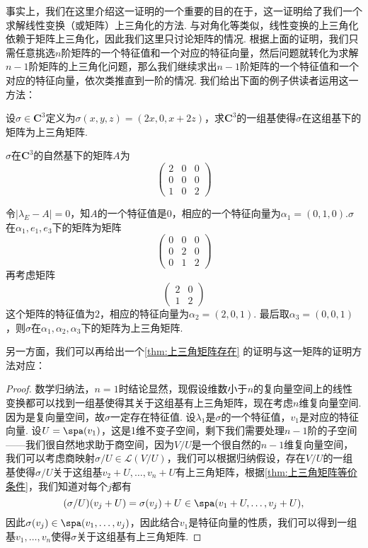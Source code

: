事实上，我们在这里介绍这一证明的一个重要的目的在于，这一证明给了我们一个求解线性变换（或矩阵）上三角化的方法. 与对角化等类似，线性变换的上三角化依赖于矩阵上三角化，因此我们这里只讨论矩阵的情况. 根据上面的证明，我们只需任意挑选$n$阶矩阵的一个特征值和一个对应的特征向量，然后问题就转化为求解$n-1$阶矩阵的上三角化问题，那么我们继续求出$n-1$阶矩阵的一个特征值和一个对应的特征向量，依次类推直到一阶的情况. 我们给出下面的例子供读者运用这一方法：
\begin{example}{}{}
    设$\sigma\in\mathbf{C}^3$定义为$\sigma(x,y,z)=(2x,0,x+2z)$，求$\mathbf{C}^3$的一组基使得$\sigma$在这组基下的矩阵为上三角矩阵.
\end{example}

\begin{solution}
    $\sigma$在$\mathbf{C}^3$的自然基下的矩阵$A$为
    \[ \begin{pmatrix}
        2 & 0 & 0 \\
        0 & 0 & 0 \\
        1 & 0 & 2
    \end{pmatrix} \]

    令$|\lambda_E-A|=0$，知$A$的一个特征值是$0$，相应的一个特征向量为$\alpha_1=(0,1,0)$.$\sigma$在$\alpha_1,e_1,e_3$下的矩阵为矩阵
    \[ \begin{pmatrix}
        0 & 0 & 0 \\
        0 & 2 & 0 \\
        0 & 1 & 2
    \end{pmatrix} \]
    再考虑矩阵
    \[ \begin{pmatrix}
        2 & 0 \\
        1 & 2
    \end{pmatrix} \]
    这个矩阵的特征值为$2$，相应的特征向量为$\alpha_2=(2,0,1)$. 最后取$\alpha_3=(0,0,1)$，则$\sigma$在$\alpha_1,\alpha_2,\alpha_3$下的矩阵为上三角矩阵.
\end{solution}

另一方面，我们可以再给出一个\autoref{thm:上三角矩阵存在} 的证明与这一矩阵的证明方法对应：
\begin{proof}
    数学归纳法，$n=1$时结论显然，现假设维数小于$n$的复向量空间上的线性变换都可以找到一组基使得其关于这组基有上三角矩阵，现在考虑$n$维复向量空间. 因为是复向量空间，故$\sigma$一定存在特征值. 设$\lambda_1$是$\sigma$的一个特征值，$v_1$是对应的特征向量. 设$U=\spa(v_1)$，这是1维不变子空间，剩下我们需要处理$n-1$阶的子空间——我们很自然地求助于商空间，因为$V/U$是一个很自然的$n-1$维复向量空间，我们可以考虑商映射$\sigma/U\in\mathcal{L}(V/U)$，我们可以根据归纳假设，存在$V/U$的一组基使得$\sigma/U$关于这组基$v_2+U,\ldots,v_n+U$有上三角矩阵，根据\autoref{thm:上三角矩阵等价条件}，我们知道对每个$j$都有
    \[(\sigma/U)(v_j+U)=\sigma(v_j)+U\in\spa(v_1+U,\ldots,v_j+U),\]
    因此$\sigma(v_j)\in\spa(v_1,\ldots,v_j)$，因此结合$v_1$是特征向量的性质，我们可以得到一组基$v_1,\ldots,v_n$使得$\sigma$关于这组基有上三角矩阵.
\end{proof}

